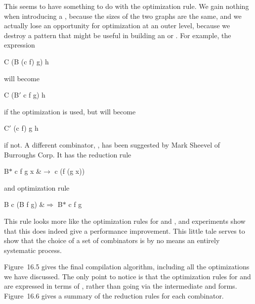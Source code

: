 This seems to have something to do with the  optimization rule. We gain nothing when introducing a , because the sizes of the two graphs are the same, and we actually lose an opportunity for optimization at an outer level, because we destroy a  pattern that might be useful in building an  or . For example, the expression
\begin{mlcoded}
    C (B (c f) g) h
\end{mlcoded}
will become
\begin{mlcoded}
    C (B$'$ c f g) h
\end{mlcoded}
if the  optimization is used, but will become
\begin{mlcoded}
    C$'$ (c f) g h
\end{mlcoded}
if not. A different combinator, , has been suggested by Mark Sheevel of Burroughs Corp. It has the reduction rule
\begin{letalign}
    B$\ast$ c f g x &$\rightarrow$ c (f (g x))
\end{letalign}
and optimization rule
\begin{letalign}
    B c (B f g) &$\Rightarrow$ B$\ast$ c f g
\end{letalign}
This rule looks more like the optimization rules for  and , and experiments show that this  does indeed give a performance improvement. This
little tale serves to show that the choice of a set of combinators is by no means an entirely systematic process.

Figure~16.5 gives the final compilation algorithm, including all the optimizations we have discussed. The only point to notice is that the optimization rules for  and  are expressed in terms of , rather than going via the intermediate  and  forms. Figure~16.6 gives a summary of the reduction rules for each combinator.

